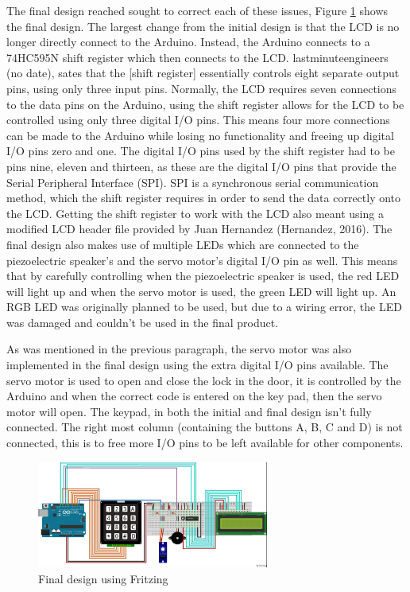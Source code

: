     The final design reached sought to correct each of these issues, Figure \ref{fig:two} shows the final design.
  The largest change from the initial design is that the LCD is no longer directly connect to the Arduino.
  Instead, the Arduino connects to a 74HC595N shift register which then connects to the LCD.
  lastminuteengineers (no date), sates that the [shift register] essentially controls eight separate output pins, using only three input pins.
  Normally, the LCD requires seven connections to the data pins on the Arduino, using the shift register allows for the LCD to be controlled using only three digital I/O pins.
  This means four more connections can be made to the Arduino while losing no functionality and freeing up digital I/O pins zero and one.
  The digital I/O pins used by the shift register had to be pins nine, eleven and thirteen, as these are the digital I/O pins that provide the Serial Peripheral Interface (SPI).
  SPI is a synchronous serial communication method, which the shift register requires in order to send the data correctly onto the LCD.
  Getting the shift register to work with the LCD also meant using a modified LCD header file provided by Juan Hernandez (Hernandez, 2016). 
    The final design also makes use of multiple LEDs which are connected to the piezoelectric speaker's and the servo motor's digital I/O pin as well.
  This means that by carefully controlling when the piezoelectric speaker is used, the red LED will light up and when the servo motor is used, the green LED will light up.
  An RGB LED was originally planned to be used, but due to a wiring error, the LED was damaged and couldn't be used in the final product.

  As was mentioned in the previous paragraph, the servo motor was also implemented in the final design using the extra digital I/O pins available.
  The servo motor is used to open and close the lock in the door, it is controlled by the Arduino and when the correct code is entered on the key pad, then the servo motor will open.
  The keypad, in both the initial and final design isn't fully connected.
  The right most column (containing the buttons A, B, C and D) is not connected, this is to free more I/O pins to be left available for other components. 
      \begin{figure}[h]
        \vspace{0.3cm}
        \begin{center}
        \includegraphics[width=0.68\textwidth]{final.jpg}
        \caption{Final design using Fritzing}
        \label{fig:two}
        \end{center}
        \vspace{0.3cm}
      \end{figure}

